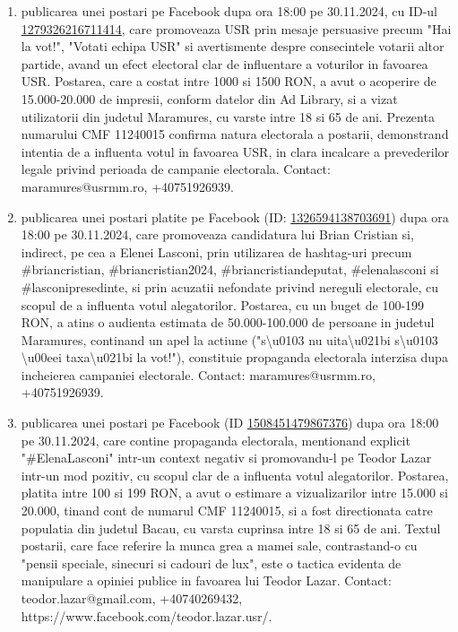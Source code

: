 \documentclass[a4paper,12pt]{article}
\begin{document}
\begin{enumerate}[leftmargin=*, label=\arabic*.)]
    \item publicarea unei postari pe Facebook dupa ora 18:00 pe 30.11.2024, cu ID-ul \href{https://www.facebook.com/ads/library/?id=1279326216711414}{1279326216711414}, care promoveaza USR prin mesaje persuasive precum "Hai la vot!", "Votati echipa USR" si avertismente despre consecintele votarii altor partide, avand un efect electoral clar de influentare a voturilor in favoarea USR. Postarea, care a costat intre 1000 si 1500 RON, a avut o acoperire de 15.000-20.000 de impresii, conform datelor din Ad Library, si a vizat utilizatorii din judetul Maramures, cu varste intre 18 si 65 de ani.  Prezenta numarului CMF 11240015 confirma natura electorala a postarii, demonstrand intentia de a influenta votul in favoarea USR, in clara incalcare a prevederilor legale privind perioada de campanie electorala.  Contact: maramures@usrmm.ro, +40751926939.
    \item publicarea unei postari platite pe Facebook (ID: \href{https://www.facebook.com/ads/library/?id=1326594138703691}{1326594138703691}) dupa ora 18:00 pe 30.11.2024, care promoveaza candidatura lui Brian Cristian si, indirect, pe cea a Elenei Lasconi,  prin utilizarea de hashtag-uri precum \#briancristian, \#briancristian2024, \#briancristiandeputat, \#elenalasconi si \#lasconipresedinte,  si prin acuzatii nefondate privind nereguli electorale, cu scopul de a influenta votul alegatorilor. Postarea, cu un buget de 100-199 RON, a atins o audienta estimata de 50.000-100.000 de persoane in judetul Maramures,  continand un apel la actiune ("s\textbackslash{}u0103 nu uita\textbackslash{}u021bi s\textbackslash{}u0103 \textbackslash{}u00eei taxa\textbackslash{}u021bi la vot!"),  constituie propaganda electorala interzisa dupa incheierea campaniei electorale.  Contact: maramures@usrmm.ro, +40751926939.
    \item publicarea unei postari pe Facebook (ID \href{https://www.facebook.com/ads/library/?id=1508451479867376}{1508451479867376}) dupa ora 18:00 pe 30.11.2024, care contine propaganda electorala,  mentionand explicit "\#ElenaLasconi" intr-un context negativ si promovandu-l pe Teodor Lazar intr-un mod pozitiv, cu scopul clar de a influenta votul alegatorilor. Postarea, platita intre 100 si 199 RON, a avut o estimare a vizualizarilor intre 15.000 si 20.000,  tinand cont de numarul CMF 11240015,  si a fost directionata catre populatia din judetul Bacau, cu varsta cuprinsa intre 18 si 65 de ani.  Textul postarii, care face referire la munca grea a mamei sale, contrastand-o cu "pensii speciale, sinecuri si cadouri de lux", este o tactica evidenta de manipulare a opiniei publice in favoarea lui Teodor Lazar.  Contact: teodor.lazar@gmail.com, +40740269432, https://www.facebook.com/teodor.lazar.usr/.

\end{enumerate}
\end{document}

